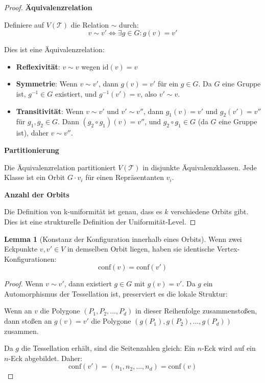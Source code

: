 \documentclass[a4paper,12pt]{article}
\theoremstyle{definition}
\newtheorem{lemma}{Lemma}[section]
\begin{document}
\begin{proof}
	\textbf{Äquivalenzrelation}
	
	Definiere auf $V(\mathcal{T})$ die Relation $\sim$ durch:
	\[
	v \sim v' \iff \exists g \in G : g(v) = v'
	\]
	
	Dies ist eine Äquivalenzrelation:
	\begin{itemize}
		\item \textbf{Reflexivität}: $v \sim v$ wegen $\text{id}(v) = v$
		\item \textbf{Symmetrie}: Wenn $v \sim v'$, dann $g(v) = v'$ für ein $g \in G$. Da $G$ eine Gruppe ist, $g^{-1} \in G$ existiert, und $g^{-1}(v') = v$, also $v' \sim v$.
		\item \textbf{Transitivität}: Wenn $v \sim v'$ und $v' \sim v''$, dann $g_1(v) = v'$ und $g_2(v') = v''$ für $g_1, g_2 \in G$. Dann $(g_2 \circ g_1)(v) = v''$, und $g_2 \circ g_1 \in G$ (da $G$ eine Gruppe ist), daher $v \sim v''$.
	\end{itemize}
	
	\textbf{Partitionierung}
	
	Die Äquivalenzrelation partitioniert $V(\mathcal{T})$ in disjunkte Äquivalenzklassen. Jede Klasse ist ein Orbit $G \cdot v_i$ für einen Repräsentanten $v_i$.
	
	\textbf{Anzahl der Orbits}
	
	Die Definition von k-uniformität ist genau, dass es $k$ verschiedene Orbits gibt. Dies ist eine strukturelle Definition der Uniformität-Level.
\end{proof}

\begin{lemma}[Konstanz der Konfiguration innerhalb eines Orbits]
	Wenn zwei Eckpunkte $v, v' \in V$ in demselben Orbit liegen, haben sie identische Vertex-Konfigurationen:
	\[
	\text{conf}(v) = \text{conf}(v')
	\]
\end{lemma}

\begin{proof}
	Wenn $v \sim v'$, dann existiert $g \in G$ mit $g(v) = v'$. Da $g$ ein Automorphismus der Tessellation ist, preserviert es die lokale Struktur:
	
	Wenn an $v$ die Polygone $(P_1, P_2, \ldots, P_d)$ in dieser Reihenfolge zusammenstoßen, dann stoßen an $g(v) = v'$ die Polygone $(g(P_1), g(P_2), \ldots, g(P_d))$ zusammen.
	
	Da $g$ die Tessellation erhält, sind die Seitenzahlen gleich: Ein $n$-Eck wird auf ein $n$-Eck abgebildet. Daher:
	\[
	\text{conf}(v') = (n_1, n_2, \ldots, n_d) = \text{conf}(v)
	\]
\end{proof}
\end{document}
